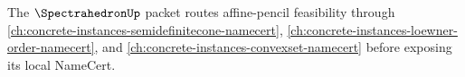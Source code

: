 The $\SpectrahedronUp$ packet routes affine-pencil feasibility through \autoref{ch:concrete-instances-semidefinitecone-namecert}, \autoref{ch:concrete-instances-loewner-order-namecert}, and \autoref{ch:concrete-instances-convexset-namecert} before exposing its local NameCert.







